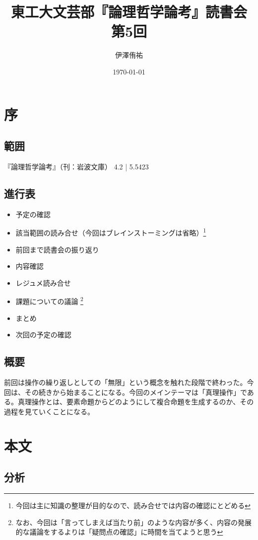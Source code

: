 \documentclass[a4paper,onecolumn,article]{jarticle}
\title{東工大文芸部『論理哲学論考』読書会 第5回}
\author{伊澤侑祐}
\date{\today}
\newcounter{ct}               %
\begin{document}
\maketitle

\section{序}
\subsection*{範囲}
『論理哲学論考』（刊：岩波文庫） 4.2 | 5.5423
\subsection*{進行表}

\begin{itemize}
  \item 予定の確認
  \item 該当範囲の読み合せ（今回はブレインストーミングは省略）\footnote{今回は主に知識の整理が目的なので、読み合せでは内容の確認にとどめる}
  \item 前回まで読書会の振り返り
  \item 内容確認
  \item レジュメ読み合せ
  \item 課題についての議論 \footnote{なお、今回は「言ってしまえば当たり前」のような内容が多く、内容の発展的な議論をするよりは「疑問点の確認」に時間を当てようと思う}
  \item まとめ
  \item 次回の予定の確認
\end{itemize} 

\subsection{概要}
前回は操作の繰り返しとしての「無限」という概念を触れた段階で終わった。今回は、その続きから始まることになる。今回のメインテーマは「真理操作」である。真理操作とは、要素命題からどのようにして複合命題を生成するのか、その過程を見ていくことになる。

\section{本文}

\subsection{分析}
\end{document}
